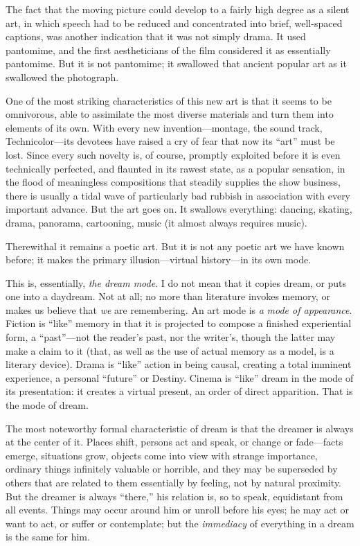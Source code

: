 \documentclass{tufte-handout}
\begin{document}
The fact that the moving picture could develop to a fairly high degree
as a silent art, in which speech had to be reduced and concen­trated into
brief, well-spaced captions, was another indication that it was not
simply drama. It used pantomime, and the first aestheticians of the film
considered it as essentially pantomime. But it is not pantomime; it
swallowed that ancient popular art as it swallowed the photograph.

One of the most striking characteristics of this new art is that it
seems to be omnivorous, able to assimilate the most diverse materials
and turn them into elements of its own. With every new
invention---mon­tage, the sound track, Technicolor---its devotees have
raised a cry of fear that now its ``art'' must be lost. Since every such
novelty is, of course, promptly exploited before it is even technically
perfected, and flaunted in its rawest state, as a popular sensation, in
the flood of meaningless compositions that steadily supplies the show
business, there is usually a tidal wave of particularly bad rubbish in
association with every im­portant advance. But the art goes on. It
swallows everything: dancing, skating, drama, panorama, cartooning,
music (it almost always requires music).

Therewithal it remains a poetic art. But it is not any poetic art we
have known before; it makes the primary illusion---virtual history---in
its own mode.

This is, essentially, \emph{the dream mode}. I do not mean that it
copies dream, or puts one into a daydream. Not at all; no more than
literature invokes memory, or makes us believe that \emph{we} are
remembering. An art mode is \emph{a} \emph{mode of appearance}. Fiction
is ``like'' memory in that it is projected to compose a finished
experiential form, a ``past''---not the reader's past, nor the writer's,
though the latter may make a claim to it (that, as well as the use of
actual memory as a model, is a literary device). Drama is ``like''
action in being causal, creating a total immi­nent experience, a personal
``future'' or Destiny. Cinema is ``like'' dream in the mode of its
presentation: it creates a virtual present, an order of direct
apparition. That is the mode of dream.

The most noteworthy formal characteristic of dream is that the dreamer
is always at the center of it. Places shift, persons act and speak, or
change or fade---facts emerge, situations grow, objects come into view
with strange importance, ordinary things infinitely valuable or
horrible, and they may be superseded by others that are related to them
essen­tially by feeling, not by natural proximity. But the dreamer is
always ``there,'' his relation is, so to speak, equidistant from all
events. Things may occur around him or unroll before his eyes; he may
act or want to act, or suffer or contemplate; but the \emph{immediacy}
of everything in a dream is the same for him.
\end{document}
